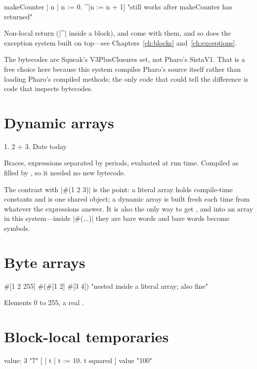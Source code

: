 \begin{st}
makeCounter
    | n |
    n := 0.
    ^[n := n + 1]           "still works after makeCounter has returned"
\end{st}

Non-local return (\ct|^| inside a block),  and
 come with them, and so does the exception system built on
top---see Chapters~\ref{ch:blocks} and~\ref{ch:exceptions}.

The bytecodes are Squeak's V3PlusClosures set, not Pharo's SistaV1. That is a
free choice here because this system compiles Pharo's source itself rather
than loading Pharo's compiled methods; the only code that could tell the
difference is code that inspects bytecodes.

\section{Dynamic arrays}

\begin{st}
{ 1. 2 + 3. Date today }
\end{st}

Braces, expressions separated by periods, evaluated at run time. Compiled as
 filled by , so it needed no new bytecode.

The contrast with \ct|#(1 2 3)| is the point: a literal array holds
compile-time constants and is one shared object; a dynamic array is built
fresh each time from whatever the expressions answer. It is also the only way
to get ,  and  into an array in this
system---inside \ct|#(...)| they are bare words and bare words become
symbols.

\section{Byte arrays}

\begin{st}
#[1 2 255]
#(#[1 2] #[3 4])        "nested inside a literal array; also fine"
\end{st}

Elements 0 to 255, a real .

\section{Block-local temporaries}

\begin{st}
[:x | | doubled | doubled := x * 2. doubled + 1] value: 3      "7"
[ | t | t := 10. t squared ] value                             "100"
\end{st}

